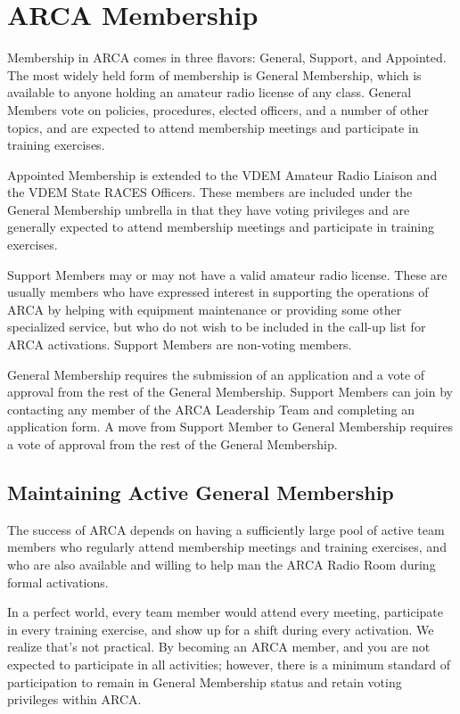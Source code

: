 \documentclass[pdflatex,letterpaper,twoside,12pt]{book}
\begin{document}
\chapter{ARCA Membership}

Membership in ARCA comes in three flavors:  General, Support, and Appointed.  The most widely held form of membership is General Membership, which is available to anyone holding an amateur radio license of any class.  General Members vote on policies, procedures, elected officers, and a number of other topics, and are expected to attend membership meetings and participate in training exercises.

Appointed Membership is extended to the VDEM Amateur Radio Liaison and the VDEM State RACES Officers.  These members are included under the General Membership umbrella in that they have voting privileges and are generally expected to attend membership meetings and participate in training exercises.

Support Members may or may not have a valid amateur radio license.  These are usually members who have expressed interest in supporting the operations of ARCA by helping with equipment maintenance or providing some other specialized service, but who do not wish to be included in the call-up list for ARCA activations.  Support Members are non-voting members.

General Membership requires the submission of an application and a vote of approval from the rest of the General Membership.  Support Members can join by contacting any member of the ARCA Leadership Team and completing an application form.  A move from Support Member to General Membership requires a vote of approval from the rest of the General Membership.

\section{Maintaining Active General Membership}

The success of ARCA depends on having a sufficiently large pool of active team members who regularly attend membership meetings and training exercises, and who are also available and willing to help man the ARCA Radio Room during formal activations.

In a perfect world, every team member would attend every meeting, participate in every training exercise, and show up for a shift during every activation.  We realize that's not practical.  By becoming an ARCA member, and you are not expected to participate in all activities; however, there is a minimum standard of participation to remain in General Membership status and retain voting privileges within ARCA.
\end{document}

